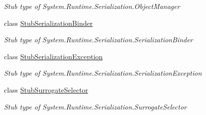 \begin{DoxyCompactItemize}
\begin{DoxyCompactList}\small\item\em Stub type of System.\-Runtime.\-Serialization.\-Object\-Manager\end{DoxyCompactList}\item 
class \hyperlink{class_system_1_1_runtime_1_1_serialization_1_1_fakes_1_1_stub_serialization_binder}{Stub\-Serialization\-Binder}
\begin{DoxyCompactList}\small\item\em Stub type of System.\-Runtime.\-Serialization.\-Serialization\-Binder\end{DoxyCompactList}\item 
class \hyperlink{class_system_1_1_runtime_1_1_serialization_1_1_fakes_1_1_stub_serialization_exception}{Stub\-Serialization\-Exception}
\begin{DoxyCompactList}\small\item\em Stub type of System.\-Runtime.\-Serialization.\-Serialization\-Exception\end{DoxyCompactList}\item 
class \hyperlink{class_system_1_1_runtime_1_1_serialization_1_1_fakes_1_1_stub_surrogate_selector}{Stub\-Surrogate\-Selector}
\begin{DoxyCompactList}\small\item\em Stub type of System.\-Runtime.\-Serialization.\-Surrogate\-Selector\end{DoxyCompactList}\end{DoxyCompactItemize}
